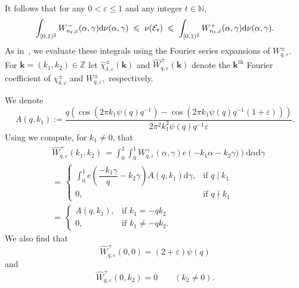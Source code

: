 \documentclass[12pt, reqno]{amsart}
\theoremstyle{definition}
\theoremstyle{remark}
\numberwithin{equation}{section}
\def\alp{{\alpha}} \def\bfalp{{\boldsymbol \alpha}}
\def\le{\leqslant} \def\ge{\geqslant}
\def\leq{\leqslant}
\def \bN {\mathbb N}
\def \bZ {\mathbb Z}
\def \cE {\mathcal E}
\def \dd {\mathrm d}
\begin{document}
It follows that for any $0<\varepsilon \le 1$ and any integer $t\in\bN$, \vspace{2mm}
\begin{equation} \label{muineq}
\int_{[0,1)^2}W_{n_t,\varepsilon}^-(\alp,\gamma)\mathrm{d}\nu(\alp,\gamma)
\; \leq  \;
\nu(\cE_t) \;  \leq \; \int_{[0,1)^2}W_{n_t,\varepsilon}^+(\alp,\gamma)\mathrm{d}\nu(\alp,\gamma). \vspace{2mm}
\end{equation}
As in~\cite{PVZZ2022}, we evaluate these integrals using the Fourier series expansions of $W_{q,\varepsilon}^{\pm}$. For 
$\mathbf{k} = (k_1,k_2) \in \bZ$ let $ \widehat{\chi}_{\delta, \varepsilon}^{\pm}(\mathbf{k})$ and $\widehat{W}_{q,\varepsilon}^{\pm}(\mathbf{k})$ denote the $\mathbf{k}^{\mathrm{th}}$ Fourier coefficient of $ {\chi}_{\delta, \varepsilon}^{\pm} $ and $ {W}_{q,\varepsilon}^{\pm},$
respectively.  

We denote
\[
A(q,k_1):=\dfrac{q\left(\cos(2\pi k_1\psi(q)q^{-1})-\cos(2\pi k_1\psi(q)q^{-1}(1+\varepsilon))\right)}{2\pi^2 k_1^2\psi(q)q^{-1}\varepsilon}.
\]
Using \cite[Equation (46)]{PVZZ2022} we compute, for $k_1\neq 0$, that
\begin{equation} 
\label{fcoef}
\begin{aligned}
&\widehat{W}_{q,\varepsilon}^+(k_1,k_2)\, =
\int_0^1\int_0^1 W_{q,\varepsilon}^{+}(\alp,\gamma) e\left(-k_1 \alp
-k_2\gamma)\right) \dd \alp \dd\gamma
\\&=
\,\begin{cases}
	\int_0^1 e\left( \dfrac{-k_1 \gamma}{ q}- k_2\gamma\right) A(q,k_1)\dd\gamma, &\text{if } q \mid k_1 \\[3ex]
	0, &\text{if } q\nmid k_1
\end{cases} \\&=
\,\begin{cases}
	A(q,k_1), &\text{if }
	k_1=-q k_2 \\[3ex]
	0, &\text{if } k_1\neq - q k_2.
\end{cases}
\end{aligned}
\end{equation}
We also find that
\begin{equation} \label{fcoef_zero}
\widehat{W}_{q,\varepsilon}^{+}(0,0)=(2+\varepsilon) \psi(q)
\end{equation}
and
\begin{equation} \label{fcoef_zero_nonzero}
\widehat{W}_{q,\varepsilon}^{+}(0,k_2)=0
\qquad (k_2 \ne 0).
\end{equation}
\end{document}
